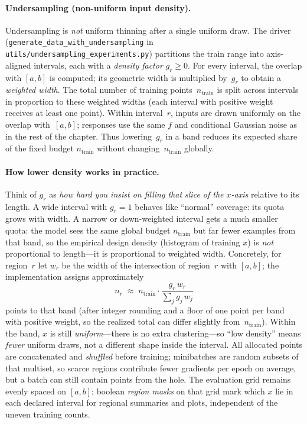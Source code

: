 \paragraph{Undersampling (non-uniform input density).}
Undersampling is \emph{not} uniform thinning after a single uniform draw. The driver (\texttt{generate\_data\_with\_undersampling} in \texttt{utils/undersampling\_experiments.py}) partitions the train range into axis-aligned intervals, each with a \emph{density factor} $g_r\ge 0$. For every interval, the overlap with $[a,b]$ is computed; its geometric width is multiplied by~$g_r$ to obtain a \emph{weighted width}. The total number of training points~$n_{\mathrm{train}}$ is split across intervals in proportion to these weighted widths (each interval with positive weight receives at least one point). Within interval~$r$, inputs are drawn uniformly on the overlap with~$[a,b]$; responses use the same $f$ and conditional Gaussian noise as in the rest of the chapter. Thus lowering~$g_r$ in a band reduces its expected share of the fixed budget $n_{\mathrm{train}}$ without changing~$n_{\mathrm{train}}$ globally.

\paragraph{How lower density works in practice.}
Think of $g_r$ as \emph{how hard you insist on filling that slice of the $x$-axis} relative to its length. A wide interval with $g_r{=}1$ behaves like ``normal'' coverage: its quota grows with width. A narrow or down-weighted interval gets a much smaller quota: the model sees the same global budget $n_{\mathrm{train}}$ but far fewer examples from that band, so the empirical design density (histogram of training $x$) is \emph{not} proportional to length---it is proportional to weighted width. Concretely, for region~$r$ let $w_r$ be the width of the intersection of region~$r$ with $[a,b]$; the implementation assigns approximately
\begin{equation*}
  n_r \;\approx\; n_{\mathrm{train}}\cdot \frac{g_r\, w_r}{\sum_j g_j\, w_j}
\end{equation*}
points to that band (after integer rounding and a floor of one point per band with positive weight, so the realized total can differ slightly from~$n_{\mathrm{train}}$). Within the band, $x$ is still \emph{uniform}---there is no extra clustering---so ``low density'' means \emph{fewer} uniform draws, not a different shape inside the interval. All allocated points are concatenated and \emph{shuffled} before training; minibatches are random subsets of that multiset, so scarce regions contribute fewer gradients per epoch on average, but a batch can still contain points from the hole. The evaluation grid remains evenly spaced on $[a,b]$; boolean \emph{region masks} on that grid mark which $x$ lie in each declared interval for regional summaries and plots, independent of the uneven training counts.

